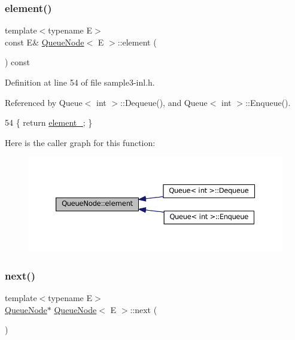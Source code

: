 \subsubsection{\texorpdfstring{element()}{element()}}
{\footnotesize\ttfamily template$<$typename E$>$ \\
const E\& \hyperlink{classQueueNode}{Queue\+Node}$<$ E $>$\+::element (\begin{DoxyParamCaption}{ }\end{DoxyParamCaption}) const\hspace{0.3cm}{\ttfamily [inline]}}



Definition at line 54 of file sample3-\/inl.\+h.



Referenced by Queue$<$ int $>$\+::\+Dequeue(), and Queue$<$ int $>$\+::\+Enqueue().


\begin{DoxyCode}
54 \{ \textcolor{keywordflow}{return} \hyperlink{classQueueNode_a593f0f5862848c1e9063d32ea3438b58}{element\_}; \}
\end{DoxyCode}
Here is the caller graph for this function\+:
\nopagebreak
\begin{figure}[H]
\begin{center}
\leavevmode
\includegraphics[width=350pt]{classQueueNode_a1c61b3ed32e089f5901b87022ef84985_icgraph}
\end{center}
\end{figure}
\mbox{\label{classQueueNode_a8a9fdf488da06533360999ef85db56ea}} 
\subsubsection{\texorpdfstring{next()}{next()}\hspace{0.1cm}{\footnotesize\ttfamily [1/2]}}
{\footnotesize\ttfamily template$<$typename E$>$ \\
\hyperlink{classQueueNode}{Queue\+Node}$\ast$ \hyperlink{classQueueNode}{Queue\+Node}$<$ E $>$\+::next (\begin{DoxyParamCaption}{ }\end{DoxyParamCaption})\hspace{0.3cm}{\ttfamily [inline]}}



